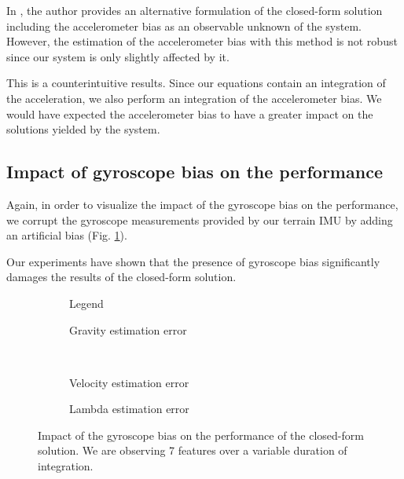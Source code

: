 \documentclass[letterpaper, 10 pt, conference]{ieeeconf}  %
\begin{document}
In \cite{Martinelli2014}, the author provides an alternative formulation of the closed-form solution including the accelerometer bias as an observable unknown of the system.
However, the estimation of the accelerometer bias with this method is not robust since our system is only slightly affected by it.

This is a counterintuitive results. Since our equations contain an integration of the acceleration, we also perform an integration of the accelerometer bias.
We would have expected the accelerometer bias to have a greater impact on the solutions yielded by the system.



\subsection{Impact of gyroscope bias on the performance}
Again, in order to visualize the impact of the gyroscope bias on the performance,
we corrupt the gyroscope measurements provided by our terrain IMU by adding an artificial bias (Fig. \ref{fig:biasGyroCF}).

Our experiments have shown that the presence of gyroscope bias significantly damages the results of the closed-form solution.

\begin{figure}
  \centering
        \hspace{0.2\columnwidth}%
        \begin{subfigure}[b]{0.3\columnwidth}
                \resizebox{\columnwidth}{!}{}
                \caption{Legend}

        \end{subfigure}%
        \begin{subfigure}[b]{0.5\columnwidth}
                \resizebox{\columnwidth}{!}{}
                \caption{Gravity estimation error}

        \end{subfigure}
        ~
        \begin{subfigure}[b]{0.5\columnwidth}
                \resizebox{\columnwidth}{!}{}
                \caption{Velocity estimation error}

        \end{subfigure}%
        \begin{subfigure}[b]{0.5\columnwidth}
                \resizebox{\columnwidth}{!}{}
                \caption{Lambda estimation error}

        \end{subfigure}
        \caption{Impact of the gyroscope bias on the performance of the closed-form solution. We are observing 7 features over a variable duration of integration. \label{fig:biasGyroCF}}
\end{figure}
\end{document}

